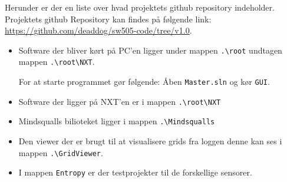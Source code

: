 Herunder er der en liste over hvad projektets github repository indeholder.
Projektets github Repository kan findes på følgende link: \url{https://github.com/deaddog/sw505-code/tree/v1.0}.
\begin{itemize}
\item Software der bliver kørt på PC'en ligger under mappen \lstinline[style=c]!.\root! undtagen mappen \lstinline[style=c]!.\root\NXT!.

For at starte programmet gør følgende:
Åben \lstinline[style=c]!Master.sln! og kør \lstinline[style=c]!GUI!.
\item Software der ligger på NXT'en er i mappen \lstinline[style=c]!.\root\NXT!
\item Mindsqualls bilioteket ligger i mappen \lstinline[style=c]!.\Mindsqualls!
\item Den viewer der er brugt til at visualisere grids fra loggen denne kan ses i mappen \lstinline[style=c]!.\GridViewer!.
\item I mappen \lstinline[style=c]!Entropy! er der testprojekter til de forskellige sensorer.
\end{itemize}